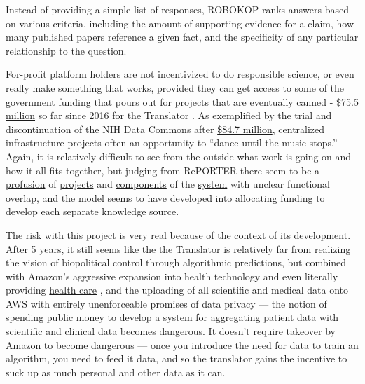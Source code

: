\documentclass[11pt]{article}
\begin{document}
\begin{multicols}{2}
\begin{leftbar}
Instead of providing a simple list of responses, ROBOKOP ranks answers
based on various criteria, including the amount of supporting evidence
for a claim, how many published papers reference a given fact, and the
specificity of any particular relationship to the question.
\end{leftbar}

For-profit platform holders are not incentivized to do responsible
science, or even really make something that works, provided they can get
access to some of the government funding that pours out for projects
that are eventually canned -
\href{https://reporter.nih.gov/search/kDJ97zGUFEaIBIltUmyd_Q/projects?sort_field=FiscalYear\&sort_order=desc}{\$75.5
million} so far since 2016 for the Translator \cite{RePORTRePORTERBiomedical2021} . As exemplified by the trial and
discontinuation of the NIH Data Commons after
\href{https://reporter.nih.gov/search/H4LxgMGK9kGw6SeWCom85Q/projects?shared=true}{\$84.7
million}, centralized infrastructure projects often an opportunity to
``dance until the music stops.'' Again, it is relatively difficult to
see from the outside what work is going on and how it all fits together,
but judging from RePORTER there seem to be a
\href{https://reporter.nih.gov/project-details/10332268}{profusion} of
\href{https://reporter.nih.gov/project-details/10333468}{projects} and
\href{https://reporter.nih.gov/project-details/10333460}{components} of
the \href{https://reporter.nih.gov/project-details/10330627}{system}
with unclear functional overlap, and the model seems to have developed
into allocating funding to develop each separate knowledge source.

The risk with this project is very real because of the context of its
development. After 5 years, it still seems like the the Translator is
relatively far from realizing the vision of biopolitical control through
algorithmic predictions, but combined with Amazon's aggressive expansion
into health technology \cite{AWSAnnouncesAWS2021}  and even
literally providing \href{https://amazon.care/}{health care} \cite{lermanAmazonBuiltIts2021} , and the uploading of all scientific and
medical data onto AWS with entirely unenforceable promises of data
privacy --- the notion of spending public money to develop a system for
aggregating patient data with scientific and clinical data becomes
dangerous. It doesn't require takeover by Amazon to become dangerous ---
once you introduce the need for data to train an algorithm, you need to
feed it data, and so the translator gains the incentive to suck up as
much personal and other data as it can.


\end{multicols}
\end{document}
